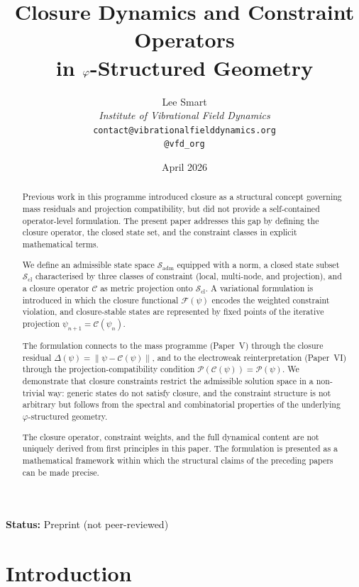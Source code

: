 \documentclass[12pt]{article}
\title{Closure Dynamics and Constraint Operators\\in $\phig$-Structured Geometry}
\author{%
  Lee Smart\\[4pt]
  \textit{Institute of Vibrational Field Dynamics}\\[2pt]
  \texttt{contact@vibrationalfielddynamics.org}\\[2pt]
  \texttt{@vfd\_org}%
}
\date{April 2026}
\newcommand{\Ccal}{\mathcal{C}}
\newcommand{\Fcal}{\mathcal{F}}
\newcommand{\Pcal}{\mathcal{P}}
\newcommand{\Sadm}{\mathcal{S}_{\mathrm{adm}}}
\newcommand{\Scl}{\mathcal{S}_{\mathrm{cl}}}
\newcommand{\phig}{\varphi}
\begin{document}
\maketitle

\noindent\textbf{Status:} Preprint (not peer-reviewed)

\begin{abstract}
Previous work in this programme introduced closure as a structural concept governing mass residuals and projection compatibility, but did not provide a self-contained operator-level formulation. The present paper addresses this gap by defining the closure operator, the closed state set, and the constraint classes in explicit mathematical terms.

We define an admissible state space $\Sadm$ equipped with a norm, a closed state subset $\Scl$ characterised by three classes of constraint (local, multi-node, and projection), and a closure operator $\Ccal$ as metric projection onto $\Scl$. A variational formulation is introduced in which the closure functional $\Fcal(\psi)$ encodes the weighted constraint violation, and closure-stable states are represented by fixed points of the iterative projection $\psi_{n+1} = \Ccal(\psi_n)$.

The formulation connects to the mass programme (Paper~V) through the closure residual $\Delta(\psi) = \|\psi - \Ccal(\psi)\|$, and to the electroweak reinterpretation (Paper~VI) through the projection-compatibility condition $\Pcal(\Ccal(\psi)) = \Pcal(\psi)$. We demonstrate that closure constraints restrict the admissible solution space in a non-trivial way: generic states do not satisfy closure, and the constraint structure is not arbitrary but follows from the spectral and combinatorial properties of the underlying $\phig$-structured geometry.

The closure operator, constraint weights, and the full dynamical content are not uniquely derived from first principles in this paper. The formulation is presented as a mathematical framework within which the structural claims of the preceding papers can be made precise.
\end{abstract}

\section{Introduction}\label{sec:intro}
\end{document}
